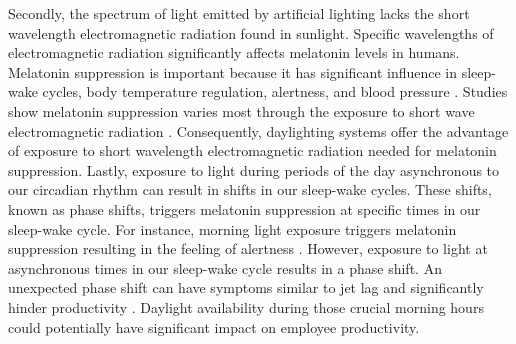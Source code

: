 Secondly, the spectrum of light emitted by artificial lighting lacks the short wavelength electromagnetic radiation found in sunlight. Specific wavelengths of electromagnetic radiation significantly affects melatonin levels in humans. Melatonin suppression is important because it has significant influence in sleep-wake cycles, body temperature regulation, alertness, and blood pressure \cite{Gooley}. Studies show melatonin suppression varies most through the exposure to short wave electromagnetic radiation \cite{Brainard}. Consequently, daylighting systems offer the advantage of exposure to short wavelength electromagnetic radiation needed for melatonin suppression. Lastly, exposure to light during periods of the day asynchronous to our circadian rhythm can result in shifts in our sleep-wake cycles. These shifts, known as phase shifts, triggers melatonin suppression at specific times in our sleep-wake cycle. For instance,  morning light exposure triggers melatonin suppression resulting in the feeling of alertness \cite{Rea}. However, exposure to light at asynchronous times in our sleep-wake cycle results in a phase shift. An unexpected phase shift can have symptoms similar to jet lag and significantly hinder productivity \cite{Rea}. Daylight availability during those crucial morning hours could potentially have significant impact on employee productivity. \\

